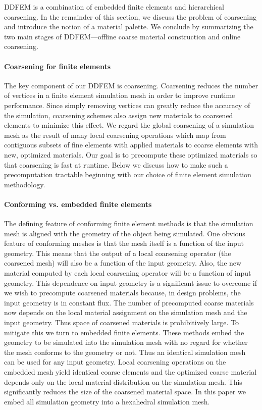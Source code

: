 DDFEM is a combination of embedded finite elements and hierarchical
coarsening.
In the remainder of this section, we discuss the problem of coarsening
and introduce the notion of a material palette. We conclude by
summarizing the two main stages of DDFEM—offline coarse material
construction and online coarsening.
\paragraph{Coarsening for finite elements}
The key component of our DDFEM is coarsening.
Coarsening reduces the number of vertices in a finite element simulation mesh in order to improve
runtime performance.
Since simply removing vertices can greatly reduce
the accuracy of the simulation, coarsening schemes also assign
new materials to coarsened elements to minimize this effect.
We regard the global coarsening of a simulation mesh as the result
of many local coarsening operations which map from contiguous
subsets of fine elements with applied materials to coarse elements
with new, optimized materials. Our goal is to precompute these
optimized materials so that coarsening is fast at runtime. Below we
discuss how to make such a precomputation tractable beginning with
our choice of finite element simulation methodology.
\paragraph{Conforming vs. embedded finite elements}
The defining feature of conforming finite element methods is that the simulation
mesh is aligned with the geometry of the object being simulated.
One obvious feature of conforming meshes is that the mesh itself is a
function of the input geometry.
This means that the output of a local coarsening operator (the coarsened mesh) will also be a function
of the input geometry.
Also, the new material computed by each local coarsening operator will be a function of input geometry.
This dependence on input geometry is a significant issue to overcome
if we wish to precompute coarsened materials because, in design
problems, the input geometry is in constant flux.
The number of precomputed coarse materials now depends on the local material
assignment on the simulation mesh and the input geometry.
Thus space of coarsened materials is prohibitively large.
To mitigate this we turn to embedded finite elements.
These methods embed the geometry to be simulated into the simulation mesh with no regard
for whether the mesh conforms to the geometry or not.
Thus an identical simulation mesh can be used for any input geometry.
Local coarsening operations on the embedded mesh yield identical coarse
elements and the optimized coarse material depends only on the
local material distribution on the simulation mesh. This significantly
reduces the size of the coarsened material space. In this paper we
embed all simulation geometry into a hexahedral simulation mesh.
